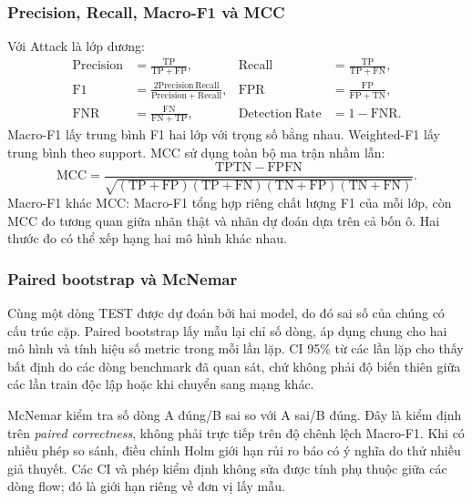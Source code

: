 \subsubsection{Precision, Recall, Macro-F1 và MCC}
Với Attack là lớp dương:
\begin{align}
\mathrm{Precision}&=\frac{\mathrm{TP}}{\mathrm{TP}+\mathrm{FP}},&
\mathrm{Recall}&=\frac{\mathrm{TP}}{\mathrm{TP}+\mathrm{FN}},\\
\mathrm{F1}&=\frac{2\mathrm{Precision}\,\mathrm{Recall}}{\mathrm{Precision}+\mathrm{Recall}},&
\mathrm{FPR}&=\frac{\mathrm{FP}}{\mathrm{FP}+\mathrm{TN}},\\
\mathrm{FNR}&=\frac{\mathrm{FN}}{\mathrm{FN}+\mathrm{TP}},&
\mathrm{Detection\ Rate}&=1-\mathrm{FNR}.
\end{align}
Macro-F1 lấy trung bình F1 hai lớp với trọng số bằng nhau. Weighted-F1 lấy trung bình theo support. MCC sử dụng toàn bộ ma trận nhầm lẫn:
\begin{equation}
\mathrm{MCC}=\frac{\mathrm{TP}\mathrm{TN}-\mathrm{FP}\mathrm{FN}}
{\sqrt{(\mathrm{TP}+\mathrm{FP})(\mathrm{TP}+\mathrm{FN})
(\mathrm{TN}+\mathrm{FP})(\mathrm{TN}+\mathrm{FN})}}.
\label{eq:mcc}
\end{equation}
Macro-F1 khác MCC: Macro-F1 tổng hợp riêng chất lượng F1 của mỗi lớp, còn MCC đo tương quan giữa nhãn thật và nhãn dự đoán dựa trên cả bốn ô. Hai thước đo có thể xếp hạng hai mô hình khác nhau.

\subsubsection{Paired bootstrap và McNemar}
Cùng một dòng TEST được dự đoán bởi hai model, do đó sai số của chúng có cấu trúc cặp. Paired bootstrap lấy mẫu lại chỉ số dòng, áp dụng chung cho hai mô hình và tính hiệu số metric trong mỗi lần lặp. CI 95\% từ các lần lặp cho thấy bất định do các dòng benchmark đã quan sát, chứ không phải độ biến thiên giữa các lần train độc lập hoặc khi chuyển sang mạng khác.

McNemar kiểm tra số dòng A đúng/B sai so với A sai/B đúng. Đây là kiểm định trên \emph{paired correctness}, không phải trực tiếp trên độ chênh lệch Macro-F1. Khi có nhiều phép so sánh, điều chỉnh Holm giới hạn rủi ro báo có ý nghĩa do thử nhiều giả thuyết. Các CI và phép kiểm định không sửa được tính phụ thuộc giữa các dòng flow; đó là giới hạn riêng về đơn vị lấy mẫu.
